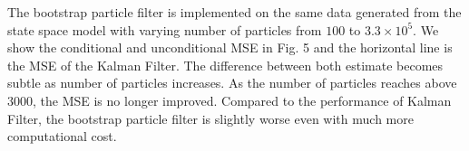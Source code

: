 \documentclass[a4paper, 11pt]{article}
\begin{document}
The bootstrap particle filter is implemented on the same data generated from the state space model with varying number of particles from $100$ to $3.3\times 10^5$. We show the conditional and unconditional MSE in Fig. 5 and the horizontal line is the MSE of the Kalman Filter. The difference between both estimate becomes subtle as number of particles increases. As the number of particles reaches above $3000$, the MSE is no longer improved. Compared to the performance of Kalman Filter, the bootstrap particle filter is slightly worse even with much more computational cost.
\end{document}
